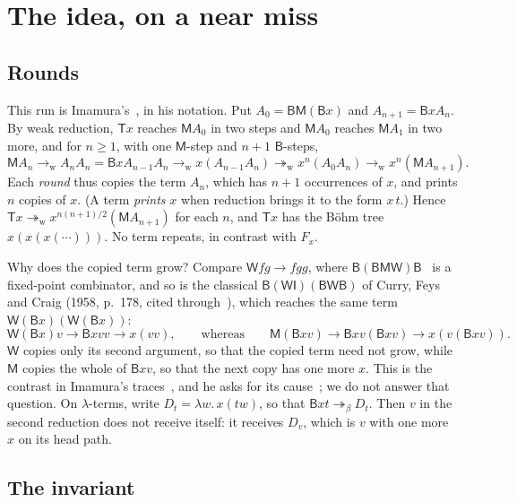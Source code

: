 \documentclass[a4paper,english]{lipics-v2021}
\newcommand{\B}{\mathsf{B}}
\newcommand{\M}{\mathsf{M}}
\newcommand{\I}{\mathsf{I}}
\newcommand{\W}{\mathsf{W}}
\newcommand{\T}{\mathsf{T}}
\newcommand{\wred}{\to_{\mathrm{w}}}
\newcommand{\wreds}{\twoheadrightarrow_{\mathrm{w}}}
\newcommand{\breds}{\twoheadrightarrow_{\beta}}
\newcommand{\Dd}[1]{D_{#1}}
\begin{document}
\section{The idea, on a near miss}\label{sec:idea}

\subsection{Rounds}\label{sec:rounds}

This run is Imamura's~\cite[Section~4.2]{imamura1}\cite[Example~4.18]{imamura2}, in his notation. Put $A_0 = \B\M(\B x)$ and $A_{n+1} = \B x A_n$. By weak reduction, $\T x$ reaches $\M A_0$ in two steps and $\M A_0$ reaches $\M A_1$ in two more, and for $n \geq 1$, with one $\M$-step and $n+1$ $\B$-steps,
\[
\M A_n \wred A_nA_n = \B xA_{n-1}A_n \wred x(A_{n-1}A_n) \wreds x^n(A_0A_n) \wred x^n(\M A_{n+1}).
\]
Each \emph{round} thus copies the term $A_n$, which has $n+1$ occurrences of $x$, and prints $n$ copies of $x$. (A term \emph{prints} $x$ when reduction brings it to the form $x\,t$.) Hence $\T x \wreds x^{n(n+1)/2}(\M A_{n+1})$ for each $n$, and $\T x$ has the Böhm tree $x(x(x(\cdots)))$. No term repeats, in contrast with $F_x$.

Why does the copied term grow? Compare $\W fg \to fgg$, where $\B(\B\M\W)\B$~\cite[p.~1]{statman2011} is a fixed-point combinator, and so is the classical $\B(\W\I)(\B\W\B)$ of Curry, Feys and Craig (1958, p.~178, cited through~\cite[Section~4.3]{imamura1}), which reaches the same term $\W(\B x)(\W(\B x))$:
\[
\W(\B x)v \to \B xvv \to x(vv), \qquad\text{whereas}\qquad \M(\B xv) \to \B xv(\B xv) \to x(v(\B xv)).
\]
$\W$ copies only its second argument, so that the copied term need not grow, while $\M$ copies the whole of $\B xv$, so that the next copy has one more $x$. This is the contrast in Imamura's traces~\cite[Section~4.3]{imamura1}, and he asks for its cause~\cite[Problem~5.1]{imamura2}; we do not answer that question. On $\lambda$-terms, write $\Dd{t} = \lambda w.\,x(tw)$, so that $\B xt \breds \Dd{t}$. Then $v$ in the second reduction does not receive itself: it receives $\Dd{v}$, which is $v$ with one more $x$ on its head path.

\subsection{The invariant}\label{sec:invariant}
\end{document}
